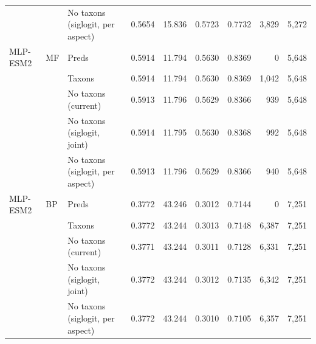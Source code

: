 \begin{tabular}{lllrrrrrr}
 &  & No taxons (siglogit, per aspect) & 0.5654 & 15.836 & 0.5723 & 0.7732 & 3{,}829 & 5{,}272 \\
\addlinespace
MLP-ESM2 & MF & Preds & 0.5914 & 11.794 & 0.5630 & 0.8369 & 0 & 5{,}648 \\
 &  & Taxons & 0.5914 & 11.794 & 0.5630 & 0.8369 & 1{,}042 & 5{,}648 \\
 &  & No taxons (current) & 0.5913 & 11.796 & 0.5629 & 0.8366 & 939 & 5{,}648 \\
 &  & No taxons (siglogit, joint) & 0.5914 & 11.795 & 0.5630 & 0.8368 & 992 & 5{,}648 \\
 &  & No taxons (siglogit, per aspect) & 0.5913 & 11.796 & 0.5629 & 0.8366 & 940 & 5{,}648 \\
\addlinespace
MLP-ESM2 & BP & Preds & 0.3772 & 43.246 & 0.3012 & 0.7144 & 0 & 7{,}251 \\
 &  & Taxons & 0.3772 & 43.244 & 0.3013 & 0.7148 & 6{,}387 & 7{,}251 \\
 &  & No taxons (current) & 0.3771 & 43.244 & 0.3011 & 0.7128 & 6{,}331 & 7{,}251 \\
 &  & No taxons (siglogit, joint) & 0.3772 & 43.244 & 0.3012 & 0.7135 & 6{,}342 & 7{,}251 \\
 &  & No taxons (siglogit, per aspect) & 0.3772 & 43.244 & 0.3010 & 0.7105 & 6{,}357 & 7{,}251 \\
\bottomrule
\end{tabular}
